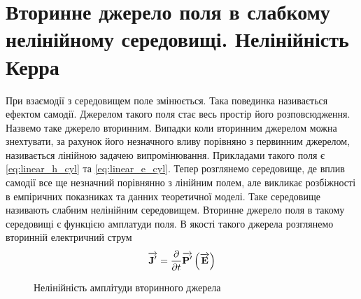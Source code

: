 \section{Вторинне джерело поля в слабкому нелінійному середовищі. 
Нелінійність Керра}

При взаємодії з середовищем поле змінюється. Така повединка називається ефектом 
самодії. Джерелом такого поля стає весь простір його розповсюдження. Назвемо 
таке джерело вторинним. Випадки коли вторинним джерелом можна знехтувати, за 
рахунок його незначного вливу порівняно з первинним джерелом, називається 
лінійною задачею випромінювання. Прикладами такого поля є 
\eqref{eq:linear_h_cyl} та \eqref{eq:linear_e_cyl}. Тепер розглянемо 
середовище, де вплив самодії все ще незначний порівнянно з лінійним полем, але
викликає розбіжності в емпіричних показниках та данних теоретичної моделі. 
Таке середовище називають слабним нелінійним середовищем. Вторинне джерело 
поля в такому середовищі є функцією амплатуди поля. В якості такого джерела 
розглянемо вторинній електричний струм
%
\begin{equation*} 
\overrightarrow{\mathbf J^\prime} = \frac{\partial }{\partial t} \overrightarrow{\mathbf P^\prime} \left( \overrightarrow{\mathbf E} \right)
\end{equation*}
%
\begin{figure}
    \centering
    \qquad
    \caption{Нелінійність амплітуди вторинного джерела}
    \label{fig:example}%
\end{figure}


